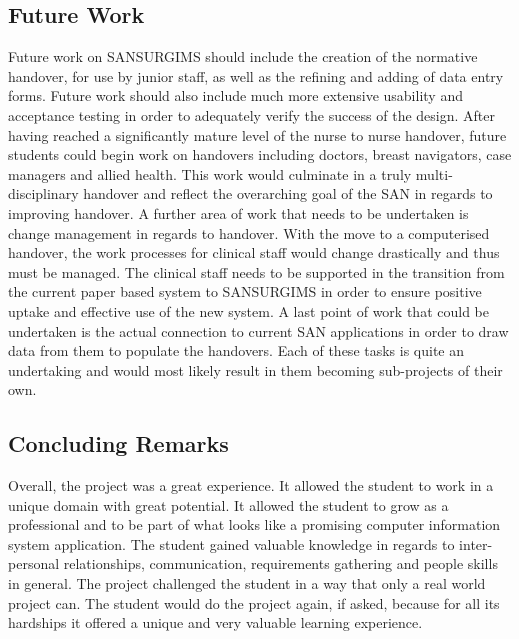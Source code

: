 \newpage
\subsection{Future Work}
Future work on SANSURGIMS should include the creation of the normative handover, for use by junior staff, as well as the refining and adding of data entry forms. Future work should also include much more extensive usability and acceptance testing in order to adequately verify the success of the design. After having reached a significantly mature level of the nurse to nurse handover, future students could begin work on handovers including doctors, breast navigators, case managers and allied health. This work would culminate in a truly multi-disciplinary handover and reflect the overarching goal of the SAN in regards to improving handover. A further area of work that needs to be undertaken is change management in regards to handover. With the move to a computerised handover, the work processes for clinical staff would change drastically and thus must be managed. The clinical staff needs to be supported in the transition from the current paper based system to SANSURGIMS in order to ensure positive uptake and effective use of the new system. A last point of work that could be undertaken is the actual connection to current SAN applications in order to draw data from them to populate the handovers. Each of these tasks is quite an undertaking and would most likely result in them becoming sub-projects of their own.

\subsection{Concluding Remarks}
Overall, the project was a great experience. It allowed the student to work in a unique domain with great potential. It allowed the student to grow as a professional and to be part of what looks like a promising computer information system application. The student gained valuable knowledge in regards to inter-personal relationships, communication, requirements gathering and people skills in general. The project challenged the student in a way that only a real world project can. The student would do the project again, if asked, because for all its hardships it offered a unique and very valuable learning experience. 